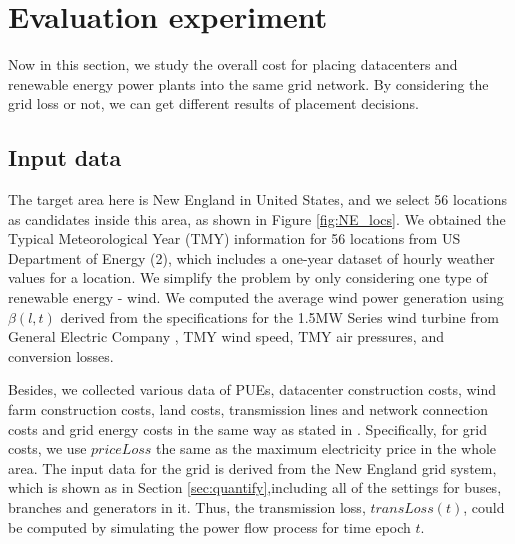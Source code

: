 \section{Evaluation experiment}
\label{sec:eval}

Now in this section, we study the overall cost for placing datacenters and renewable energy power plants into the same grid network. By considering the grid loss or not, we can get different results of placement decisions.

\subsection{Input data}

The target area here is New England in United States, and we select 56 locations as candidates inside this area, as shown in Figure \ref{fig:NE_locs}. We obtained the Typical Meteorological Year (TMY) information for 56 locations from US Department of Energy (2), which includes a one-year dataset of hourly weather values for a location. We simplify the problem by only considering one type of renewable energy - wind. We computed the average wind power generation using $\beta(l,t)$ derived from the specifications for the 1.5MW Series wind turbine from General Electric Company \cite{GE15MW}, TMY wind speed, TMY air pressures, and conversion losses.

Besides, we collected various data of PUEs, datacenter construction costs, wind farm construction costs, land costs, transmission lines and network connection costs and grid energy costs in the same way as stated in \cite{berral2014building}. Specifically, for grid costs, we use $priceLoss$ the same as the maximum electricity price in the whole area. The input data for the grid is derived from the New England grid system, which is shown as in Section \ref{sec:quantify},including all of the settings for buses, branches and generators in it. Thus, the transmission loss, $transLoss(t)$, could be computed by simulating the power flow process for time epoch $t$.  %


